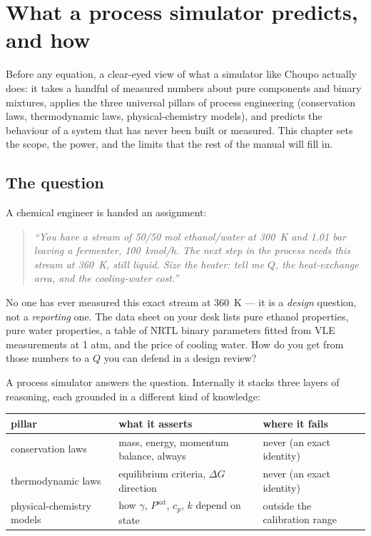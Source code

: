 \documentclass[11pt,a4paper]{article}
\begin{document}
\section{What a process simulator predicts, and how}\label{ch:three-pillars}

\begin{whatyoulllearn}
Before any equation, a clear-eyed view of what a simulator like
Choupo actually does: it takes a handful of measured numbers
about pure components and binary mixtures, applies the three
universal pillars of process engineering (conservation laws,
thermodynamic laws, physical-chemistry models), and predicts the
behaviour of a system that has never been built or measured.  This
chapter sets the scope, the power, and the limits that the rest of
the manual will fill in.
\end{whatyoulllearn}

\subsection{The question}

A chemical engineer is handed an assignment:

\begin{quote}
\itshape
``You have a stream of 50/50 mol ethanol/water at 300~K and 1.01 bar
leaving a fermenter, 100~kmol/h.  The next step in the process needs
this stream at 360~K, still liquid.  Size the heater: tell me $Q$,
the heat-exchange area, and the cooling-water cost.''
\end{quote}

No one has ever measured this exact stream at 360~K --- it is a
\emph{design} question, not a \emph{reporting} one.  The data sheet
on your desk lists pure ethanol properties, pure water properties, a
table of NRTL binary parameters fitted from VLE measurements at 1
atm, and the price of cooling water.  How do you get from those
numbers to a $Q$ you can defend in a design review?

A process simulator answers the question.  Internally it stacks
three layers of reasoning, each grounded in a different kind of
knowledge:

\begin{center}\small
\begin{tabular}{@{}lll@{}}
\toprule
pillar               & what it asserts                          & where it fails\\
\midrule
conservation laws    & mass, energy, momentum balance, always   & never (an exact identity) \\
thermodynamic laws   & equilibrium criteria, $\Delta G$ direction & never (an exact identity) \\
physical-chemistry models & how $\gamma$, $P^{\mathrm{sat}}$, $c_p$, $k$ depend on state & outside the calibration range \\
\bottomrule
\end{tabular}
\end{center}
\end{document}
